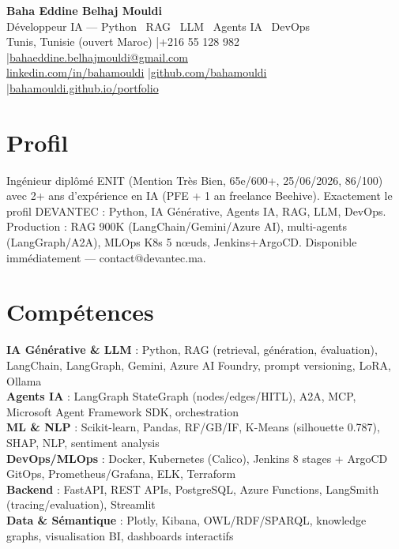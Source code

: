 \documentclass[a4paper,10pt]{article}
\begin{document}
\begin{center}
{\LARGE\bfseries\color{navy} Baha Eddine Belhaj Mouldi}\\[4pt]
{\large Développeur IA — Python \textbar\ RAG \textbar\ LLM \textbar\ Agents IA \textbar\ DevOps}\\[6pt]
\normalsize
Tunis, Tunisie (ouvert Maroc) \quad|\quad +216 55 128 982 \quad|\quad \href{mailto:bahaeddine.belhajmouldi@gmail.com}{bahaeddine.belhajmouldi@gmail.com}\\[2pt]
\href{https://www.linkedin.com/in/bahamouldi}{linkedin.com/in/bahamouldi} \quad|\quad \href{https://github.com/bahamouldi}{github.com/bahamouldi} \quad|\quad \href{https://bahamouldi.github.io/portfolio/}{bahamouldi.github.io/portfolio}
\end{center}
\vspace{4pt}

\section{Profil}
Ingénieur diplômé ENIT (Mention Très Bien, 65e/600+, 25/06/2026, 86/100) avec 2+ ans d'expérience en IA (PFE + 1 an freelance Beehive). Exactement le profil DEVANTEC : Python, IA Générative, Agents IA, RAG, LLM, DevOps. Production : RAG 900K (LangChain/Gemini/Azure AI), multi-agents (LangGraph/A2A), MLOps K8s 5 nœuds, Jenkins+ArgoCD. Disponible immédiatement — contact@devantec.ma.

\section{Compétences}
\textbf{IA Générative \& LLM} : Python, RAG (retrieval, génération, évaluation), LangChain, LangGraph, Gemini, Azure AI Foundry, prompt versioning, LoRA, Ollama\\[2pt]
\textbf{Agents IA} : LangGraph StateGraph (nodes/edges/HITL), A2A, MCP, Microsoft Agent Framework SDK, orchestration\\[2pt]
\textbf{ML \& NLP} : Scikit-learn, Pandas, RF/GB/IF, K-Means (silhouette 0.787), SHAP, NLP, sentiment analysis\\[2pt]
\textbf{DevOps/MLOps} : Docker, Kubernetes (Calico), Jenkins 8 stages + ArgoCD GitOps, Prometheus/Grafana, ELK, Terraform\\[2pt]
\textbf{Backend} : FastAPI, REST APIs, PostgreSQL, Azure Functions, LangSmith (tracing/evaluation), Streamlit\\[2pt]
\textbf{Data \& Sémantique} : Plotly, Kibana, OWL/RDF/SPARQL, knowledge graphs, visualisation BI, dashboards interactifs
\end{document}
